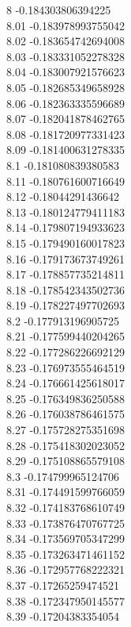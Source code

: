 {8	-0.184303806394225\\
8.01	-0.183978993755042\\
8.02	-0.183654742694008\\
8.03	-0.183331052278328\\
8.04	-0.183007921576623\\
8.05	-0.182685349658928\\
8.06	-0.182363335596689\\
8.07	-0.182041878462765\\
8.08	-0.181720977331423\\
8.09	-0.181400631278335\\
8.1	-0.181080839380583\\
8.11	-0.180761600716649\\
8.12	-0.18044291436642\\
8.13	-0.180124779411183\\
8.14	-0.179807194933623\\
8.15	-0.179490160017823\\
8.16	-0.179173673749261\\
8.17	-0.178857735214811\\
8.18	-0.178542343502736\\
8.19	-0.178227497702693\\
8.2	-0.177913196905725\\
8.21	-0.177599440204265\\
8.22	-0.177286226692129\\
8.23	-0.176973555464519\\
8.24	-0.176661425618017\\
8.25	-0.176349836250588\\
8.26	-0.176038786461575\\
8.27	-0.175728275351698\\
8.28	-0.175418302023052\\
8.29	-0.175108865579108\\
8.3	-0.174799965124706\\
8.31	-0.174491599766059\\
8.32	-0.174183768610749\\
8.33	-0.173876470767725\\
8.34	-0.173569705347299\\
8.35	-0.173263471461152\\
8.36	-0.172957768222321\\
8.37	-0.17265259474521\\
8.38	-0.172347950145577\\
8.39	-0.17204383354054\\
}

